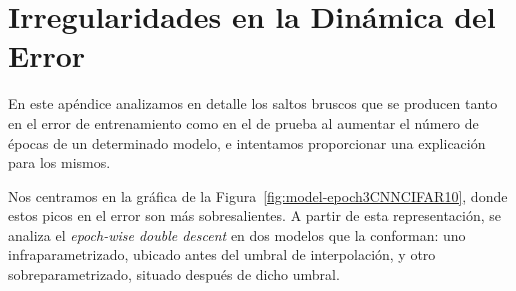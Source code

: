 
\chapter{Irregularidades en la Dinámica del Error}\label{ap:apendiceC}

En este apéndice analizamos en detalle los saltos bruscos que se producen tanto en el error de entrenamiento como en el de prueba al aumentar el número de épocas de un determinado modelo, e intentamos proporcionar una explicación para los mismos.\newline

Nos centramos en la gráfica de la Figura~\ref{fig:model-epoch3CNNCIFAR10}, donde estos picos en el error son más sobresalientes. A partir de esta representación, se analiza el \textit{epoch-wise double descent} en dos modelos que la conforman: uno infraparametrizado, ubicado antes del umbral de interpolación, y otro sobreparametrizado, situado después de dicho umbral.\newline

